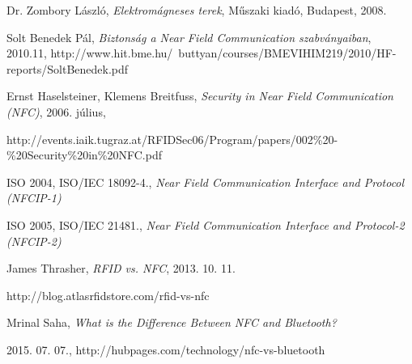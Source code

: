 \documentclass[12pt]{article}
\begin{document}
\begin{thebibliography}{9}

    Dr. Zombory László,
    \emph{Elektromágneses terek},
    Műszaki kiadó, Budapest,
    2008.
  
    Solt Benedek Pál,
    \emph{Biztonság a Near Field Communication szabványaiban},
    2010.11, 
    http://www.hit.bme.hu/~buttyan/courses/BMEVIHIM219/2010/HF-reports/SoltBenedek.pdf
    
    Ernst Haselsteiner, Klemens Breitfuss,
    \emph{Security in Near Field Communication (NFC)},
    2006. július,
    
    http://events.iaik.tugraz.at/RFIDSec06/Program/papers/002\%20-\%20Security\%20in\%20NFC.pdf
    
    ISO 2004, ISO/IEC  18092-4., 
    \emph{Near Field Communication Interface and Protocol (NFCIP-1)}

    ISO 2005, ISO/IEC  21481.,
    \emph{Near Field Communication Interface and Protocol-2 (NFCIP-2)}
    
    James Thrasher,
    \emph{RFID vs. NFC},
    2013. 10. 11.
    
    http://blog.atlasrfidstore.com/rfid-vs-nfc
    
    Mrinal Saha,
    \emph{What is the Difference Between NFC and Bluetooth?}
    
    2015. 07. 07., http://hubpages.com/technology/nfc-vs-bluetooth

\end{thebibliography}
\end{document}
